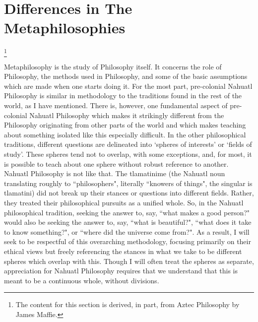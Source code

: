 \section{Differences in The Metaphilosophies}\footnote{The content for this section is derived, in part, from Aztec Philosophy by James Maffie.\autocite{Maffie1}}

Metaphilosophy is the study of Philosophy itself. It concerns the role of Philosophy, the methods used in Philosophy, and some of the basic assumptions which are made when one starts doing it. For the most part, pre-colonial Nahuatl Philosophy is similar in methodology to the traditions found in the rest of the world, as I have mentioned. There is, however, one fundamental aspect of pre-colonial Nahuatl Philosophy which makes it strikingly different from the Philosophy originating from other parts of the world and which makes teaching about something isolated like this especially difficult. In the other philosophical traditions, different questions are delineated into `spheres of interests' or `fields of study'. These spheres tend not to overlap, with some exceptions, and, for most, it is possible to teach about one sphere without robust reference to another. Nahuatl Philosophy is not like that. The tlamatinime (the Nahuatl noun translating roughly to ``philosophers", literally ``knowers of things", the singular is tlamatini) did not break up their stances or questions into different fields. Rather, they treated their philosophical pursuits as a unified whole. So, in the Nahuatl philosophical tradition, seeking the answer to, say, ``what makes a good person?" would also be seeking the answer to, say, ``what is beautiful?", ``what does it take to know something?", or ``where did the universe come from?". As a result, I will seek to be respectful of this overarching methodology, focusing primarily on their ethical views but freely referencing the stances in what we take to be different spheres which overlap with this. Though I will often treat the spheres as separate, appreciation for Nahuatl Philosophy requires that we understand that this is meant to be a continuous whole, without divisions.

